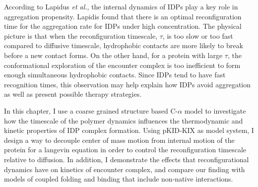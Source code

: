 \documentclass[../talant.diss.submit.tex]{subfiles}
\begin{document}
According to Lapidus \textit{et al.}, the internal dynamics of IDPs play a key role in
aggregation propensity.\cite{ahmad:12} Lapidis found that there is an optimal reconfiguration
time for the aggregation rate for IDPs under high concentration.
The physical picture is that when the reconfiguration timescale, $\tau$, is too slow or too fast
compared to diffusive timescale, hydrophobic contacts are more likely to break before a new
contact forms. On the other hand, for a protein with large $\tau$, the conformational
exploration of the encounter complex is too inefficient to form enough simultaneous hydrophobic
contacts. Since IDPs tend to have fast recognition times, this observation may help explain how
IDPs avoid aggregation as well as present possible therapy strategies.

In this chapter, I use a coarse grained structure based C-$\alpha$ model
to investigate how the timescale of the polymer dynamics influences the thermodynamic and kinetic properties of IDP complex
formation. Using pKID-KIX as model system,
I design a way to  decouple center of mass motion from internal motion of the protein for a
langevin equation in order to control the
reconfiguration timescale relative to diffusion. In addition,
I demonstrate the effects that reconfigurational dynamics have on kinetics of encounter complex,
and compare our finding with models of coupled folding and binding that include non-native
interactions. 


\end{document}
